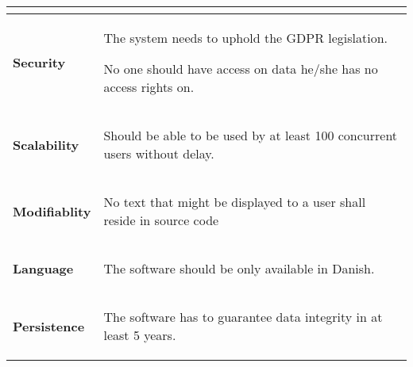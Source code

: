 \begin{table}[htb!]
\begin{tabularx}{\textwidth}{l|X}
\begin{compactitem}
	    \end{compactitem}\\
	\hline
	\textbf{Security} & 
		\begin{compactitem}
    	        \item The system needs to uphold the GDPR legislation.
    	        \item No one should have access on data he/she has no access rights on.
	    \end{compactitem}\\
	\hline
	\textbf{Scalability} & 
	    \begin{compactitem}
    	    \item Should be able to be used by at least 100 concurrent users without delay.
		\end{compactitem}\\
	\hline
	\textbf{Modifiablity} & 
	\begin{compactitem}
        \item No text that might be displayed to a user shall reside in source code
	\end{compactitem}\\
	\hline
	\textbf{Language} & 
	    \begin{compactitem}
	        \item The software should be only available in Danish.
	    \end{compactitem}\\
	\hline
	\textbf{Persistence} & 
	\begin{compactitem}
	    \item The software has to guarantee data integrity in at least 5 years.
	\end{compactitem}\\
	\hline
\end{tabularx}
\end{table}